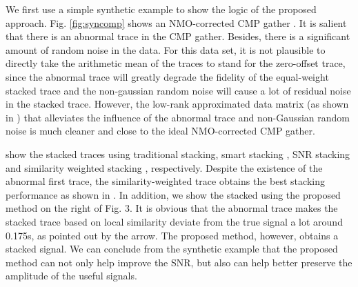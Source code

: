 We first use a simple synthetic example to show the logic of the proposed approach. Fig. \ref{fig:syncomp} shows an NMO-corrected CMP gather . It is salient that there is an abnormal trace in the CMP gather. Besides, there is a significant amount of random noise in the data. For this data set, it is not plausible to directly take the arithmetic mean of the traces to stand for the zero-offset trace, since the abnormal trace will greatly degrade the fidelity of the equal-weight stacked trace and the non-gaussian random noise will cause a lot of residual noise in the stacked trace. However, the low-rank approximated data matrix (as shown in ) that alleviates the influence of the abnormal trace and non-Gaussian random noise is much cleaner and close to the ideal NMO-corrected CMP gather.  

 show the stacked traces using traditional stacking, smart stacking \cite{Rashed08}, SNR stacking \cite{Neelamani06} and similarity weighted stacking  \cite{Liu09}, respectively. Despite the existence of the abnormal first trace, the similarity-weighted trace obtains the best stacking performance as shown in \cite{Liu09}.  In addition, we show the stacked  using the proposed method on the right of Fig. 3. It is obvious that the abnormal trace makes the stacked trace based on local similarity deviate from the true signal a lot around 0.175s, as pointed out by the arrow. The proposed method, however, obtains a  stacked signal.   We can conclude from the synthetic example that the proposed method can not only help improve the SNR, but also can help better preserve the amplitude of the useful signals. %



